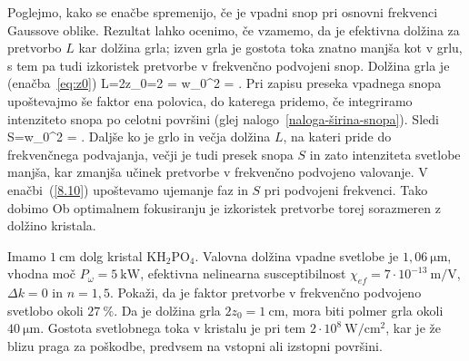 Poglejmo, kako se enačbe spremenijo, če je vpadni snop pri osnovni 
frekvenci Gaussove oblike. 
Rezultat lahko ocenimo, če vzamemo, da je
efektivna dolžina za pretvorbo $L$ kar dolžina grla; izven grla je 
gostota toka znatno manjša kot v grlu, s tem pa tudi izkoristek pretvorbe v 
frekvenčno podvojeni snop.
Dolžina grla je (enačba~\ref{eq:z0})
\beq
L=2z_{0}=2 =   \quad {} \quad 
w_{0}^{2} = .
\label{SHGG}
\eeq
Pri zapisu preseka vpadnega snopa upoštevajmo še faktor ena polovica, do katerega 
pridemo, če integriramo intenziteto 
snopa po celotni površini (glej nalogo~\ref{naloga-širina-snopa}). Sledi
\beq
S=\pi w_{0}^{2} = .
\eeq
Daljše ko je grlo in večja dolžina $L$, na kateri pride do frekvenčnega podvajanja, 
večji je tudi presek snopa $S$ in zato intenziteta svetlobe manjša, kar zmanjša
učinek pretvorbe v frekvenčno podvojeno valovanje.
V enačbi~(\ref{8.10}) upoštevamo ujemanje faz in $S$ pri podvojeni frekvenci. Tako dobimo 
Ob optimalnem fokusiranju je izkoristek pretvorbe torej sorazmeren z dolžino kristala.
\begin{definition}
Imamo $1~\si{\centi\metre}$ dolg kristal KH$_{2}$PO$_{4}$. Valovna dolžina vpadne svetlobe 
je $1,06~\si{\micro\metre}$, vhodna moč $P_\omega = 5~\si{\kilo\watt}$, efektivna nelinearna susceptibilnost
$\chi_{ef}=7\cdot10^{-13}~\si{\metre/\volt}$, $\Delta k=0$ in $n=1,5$. Pokaži, da je
faktor pretvorbe v frekvenčno podvojeno svetlobo okoli $27~\%$.
Da je dolžina grla $2z_{0}=1~\si{\centi\metre}$, mora biti polmer
grla okoli $40~\si{\micro\metre}$. Gostota svetlobnega toka v kristalu je pri
tem $2\cdot10^{8}~\si{\watt/\centi\metre^{2}}$, kar je že blizu praga za poškodbe,
predvsem na vstopni ali izstopni površini. 
\end{definition}

